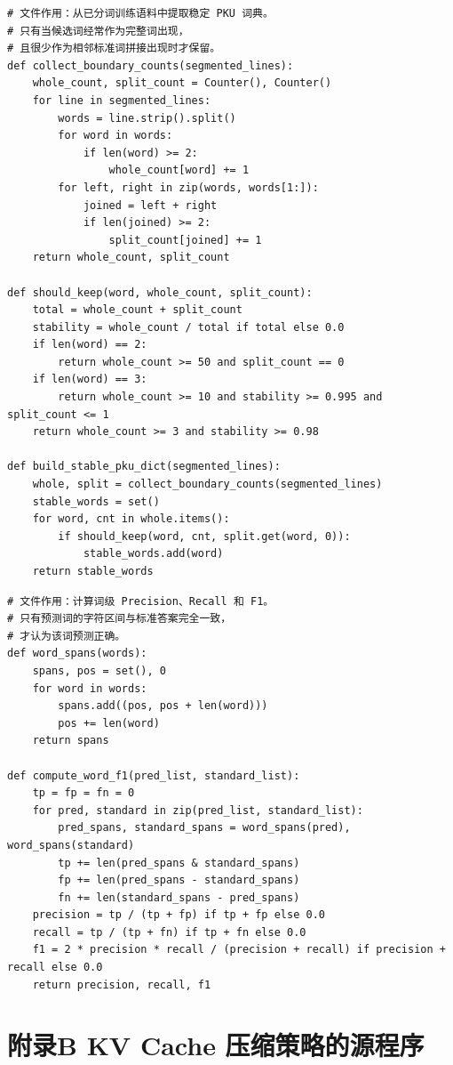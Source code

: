 \documentclass[12pt,a4paper,UTF8]{ctexart}
\newcommand{\xiaosi}{\fontsize{12pt}{18pt}\selectfont}
\newenvironment{reportbody}{\songti\xiaosi\onehalfspacing\sloppy}{}
\begin{document}
\begin{reportbody}
\begin{lstlisting}[style=appendixcode, caption={build\_pku\_dict.py：稳定 PKU 词典提取}]
# 文件作用：从已分词训练语料中提取稳定 PKU 词典。
# 只有当候选词经常作为完整词出现，
# 且很少作为相邻标准词拼接出现时才保留。
def collect_boundary_counts(segmented_lines):
    whole_count, split_count = Counter(), Counter()
    for line in segmented_lines:
        words = line.strip().split()
        for word in words:
            if len(word) >= 2:
                whole_count[word] += 1
        for left, right in zip(words, words[1:]):
            joined = left + right
            if len(joined) >= 2:
                split_count[joined] += 1
    return whole_count, split_count

def should_keep(word, whole_count, split_count):
    total = whole_count + split_count
    stability = whole_count / total if total else 0.0
    if len(word) == 2:
        return whole_count >= 50 and split_count == 0
    if len(word) == 3:
        return whole_count >= 10 and stability >= 0.995 and split_count <= 1
    return whole_count >= 3 and stability >= 0.98

def build_stable_pku_dict(segmented_lines):
    whole, split = collect_boundary_counts(segmented_lines)
    stable_words = set()
    for word, cnt in whole.items():
        if should_keep(word, cnt, split.get(word, 0)):
            stable_words.add(word)
    return stable_words
\end{lstlisting}

\begin{lstlisting}[style=appendixcode, caption={eval\_dict\_on\_cws\_val.py：词级 F1 评测}]
# 文件作用：计算词级 Precision、Recall 和 F1。
# 只有预测词的字符区间与标准答案完全一致，
# 才认为该词预测正确。
def word_spans(words):
    spans, pos = set(), 0
    for word in words:
        spans.add((pos, pos + len(word)))
        pos += len(word)
    return spans

def compute_word_f1(pred_list, standard_list):
    tp = fp = fn = 0
    for pred, standard in zip(pred_list, standard_list):
        pred_spans, standard_spans = word_spans(pred), word_spans(standard)
        tp += len(pred_spans & standard_spans)
        fp += len(pred_spans - standard_spans)
        fn += len(standard_spans - pred_spans)
    precision = tp / (tp + fp) if tp + fp else 0.0
    recall = tp / (tp + fn) if tp + fn else 0.0
    f1 = 2 * precision * recall / (precision + recall) if precision + recall else 0.0
    return precision, recall, f1
\end{lstlisting}

\clearpage
\section*{附录B KV Cache 压缩策略的源程序}
{}


\end{reportbody}
\end{document}
